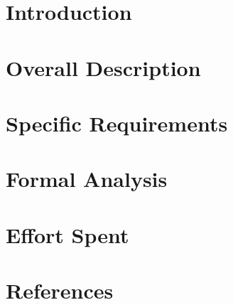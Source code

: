\documentclass{Configuration_Files/PoliMi3i_thesis}
\begin{document}

\chapter{Introduction}


\chapter{Overall Description}


\chapter{Specific Requirements}


\chapter{Formal Analysis}


\chapter{Effort Spent}


\chapter{References}


\cleardoublepage
\end{document}
